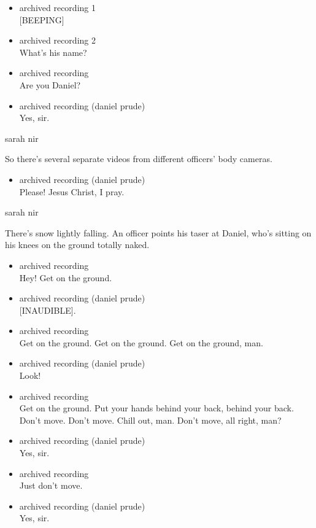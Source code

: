 \begin{itemize}
\item
  archived recording 1\\
  {[}BEEPING{]}
\item
  archived recording 2\\
  What's his name?
\item
  archived recording\\
  Are you Daniel?
\item
  archived recording (daniel prude)\\
  Yes, sir.
\end{itemize}

sarah nir

So there's several separate videos from different officers' body
cameras.

\begin{itemize}
\tightlist
\item
  archived recording (daniel prude)\\
  Please! Jesus Christ, I pray.
\end{itemize}

sarah nir

There's snow lightly falling. An officer points his taser at Daniel,
who's sitting on his knees on the ground totally naked.

\begin{itemize}
\item
  archived recording\\
  Hey! Get on the ground.
\item
  archived recording (daniel prude)\\
  {[}INAUDIBLE{]}.
\item
  archived recording\\
  Get on the ground. Get on the ground. Get on the ground, man.
\item
  archived recording (daniel prude)\\
  Look!
\item
  archived recording\\
  Get on the ground. Put your hands behind your back, behind your back.
  Don't move. Don't move. Chill out, man. Don't move, all right, man?
\item
  archived recording (daniel prude)\\
  Yes, sir.
\item
  archived recording\\
  Just don't move.
\item
  archived recording (daniel prude)\\
  Yes, sir.
\end{itemize}

